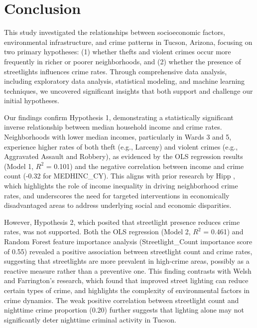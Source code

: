 \documentclass{report}
\begin{document}
\chapter{Conclusion}

\par This study investigated the relationships between socioeconomic factors, environmental infrastructure, and crime patterns in Tucson, Arizona, focusing on two primary hypotheses: (1) whether thefts and violent crimes occur more frequently in richer or poorer neighborhoods, and (2) whether the presence of streetlights influences crime rates. Through comprehensive data analysis, including exploratory data analysis, statistical modeling, and machine learning techniques, we uncovered significant insights that both support and challenge our initial hypotheses.

\par Our findings confirm Hypothesis 1, demonstrating a statistically significant inverse relationship between median household income and crime rates. Neighborhoods with lower median incomes, particularly in Wards 3 and 5, experience higher rates of both theft (e.g., Larceny) and violent crimes (e.g., Aggravated Assault and Robbery), as evidenced by the OLS regression results (Model 1, $R^2$ = 0.101) and the negative correlation between income and crime count (-0.32 for MEDHINC\_CY). This aligns with prior research by Hipp \cite{jr07}, which highlights the role of income inequality in driving neighborhood crime rates, and underscores the need for targeted interventions in economically disadvantaged areas to address underlying social and economic disparities.

\par However, Hypothesis 2, which posited that streetlight presence reduces crime rates, was not supported. Both the OLS regression (Model 2, $R^2$ = 0.461) and Random Forest feature importance analysis (Streetlight\_Count importance score of 0.55) revealed a positive association between streetlight count and crime rates, suggesting that streetlights are more prevalent in high-crime areas, possibly as a reactive measure rather than a preventive one. This finding contrasts with Welsh and Farrington's \cite{welsh08} research, which found that improved street lighting can reduce certain types of crime, and highlights the complexity of environmental factors in crime dynamics. The weak positive correlation between streetlight count and nighttime crime proportion (0.20) further suggests that lighting alone may not significantly deter nighttime criminal activity in Tucson.
\end{document}
